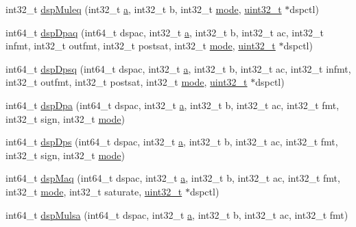 \begin{DoxyCompactItemize}
\item 
int32\_\-t \hyperlink{namespaceMipsISA_a1c1ae7be51569f81566b140606caa2bd}{dspMuleq} (int32\_\-t \hyperlink{namespaceMipsISA_ad15ace88a723e43c4e98c8c646891e79}{a}, int32\_\-t b, int32\_\-t \hyperlink{namespaceMipsISA_ae317cde5969f1a58116b73ae0d8adec0}{mode}, \hyperlink{Type_8hh_a435d1572bf3f880d55459d9805097f62}{uint32\_\-t} $\ast$dspctl)
\item 
int64\_\-t \hyperlink{namespaceMipsISA_a972387186c5bda88a6be1af70b202fd6}{dspDpaq} (int64\_\-t dspac, int32\_\-t \hyperlink{namespaceMipsISA_ad15ace88a723e43c4e98c8c646891e79}{a}, int32\_\-t b, int32\_\-t ac, int32\_\-t infmt, int32\_\-t outfmt, int32\_\-t postsat, int32\_\-t \hyperlink{namespaceMipsISA_ae317cde5969f1a58116b73ae0d8adec0}{mode}, \hyperlink{Type_8hh_a435d1572bf3f880d55459d9805097f62}{uint32\_\-t} $\ast$dspctl)
\item 
int64\_\-t \hyperlink{namespaceMipsISA_af540064c201122fe024672680efb7b83}{dspDpsq} (int64\_\-t dspac, int32\_\-t \hyperlink{namespaceMipsISA_ad15ace88a723e43c4e98c8c646891e79}{a}, int32\_\-t b, int32\_\-t ac, int32\_\-t infmt, int32\_\-t outfmt, int32\_\-t postsat, int32\_\-t \hyperlink{namespaceMipsISA_ae317cde5969f1a58116b73ae0d8adec0}{mode}, \hyperlink{Type_8hh_a435d1572bf3f880d55459d9805097f62}{uint32\_\-t} $\ast$dspctl)
\item 
int64\_\-t \hyperlink{namespaceMipsISA_aed3186e17a520b2f8e0086ffdd7020d4}{dspDpa} (int64\_\-t dspac, int32\_\-t \hyperlink{namespaceMipsISA_ad15ace88a723e43c4e98c8c646891e79}{a}, int32\_\-t b, int32\_\-t ac, int32\_\-t fmt, int32\_\-t sign, int32\_\-t \hyperlink{namespaceMipsISA_ae317cde5969f1a58116b73ae0d8adec0}{mode})
\item 
int64\_\-t \hyperlink{namespaceMipsISA_a1a929f7695ad8008ac3ccb032cdcdd6b}{dspDps} (int64\_\-t dspac, int32\_\-t \hyperlink{namespaceMipsISA_ad15ace88a723e43c4e98c8c646891e79}{a}, int32\_\-t b, int32\_\-t ac, int32\_\-t fmt, int32\_\-t sign, int32\_\-t \hyperlink{namespaceMipsISA_ae317cde5969f1a58116b73ae0d8adec0}{mode})
\item 
int64\_\-t \hyperlink{namespaceMipsISA_a6279e65f0daf37eafa4bbd108beb11a6}{dspMaq} (int64\_\-t dspac, int32\_\-t \hyperlink{namespaceMipsISA_ad15ace88a723e43c4e98c8c646891e79}{a}, int32\_\-t b, int32\_\-t ac, int32\_\-t fmt, int32\_\-t \hyperlink{namespaceMipsISA_ae317cde5969f1a58116b73ae0d8adec0}{mode}, int32\_\-t saturate, \hyperlink{Type_8hh_a435d1572bf3f880d55459d9805097f62}{uint32\_\-t} $\ast$dspctl)
\item 
int64\_\-t \hyperlink{namespaceMipsISA_a5ee886f543d611b1ed90edbab6ed65ea}{dspMulsa} (int64\_\-t dspac, int32\_\-t \hyperlink{namespaceMipsISA_ad15ace88a723e43c4e98c8c646891e79}{a}, int32\_\-t b, int32\_\-t ac, int32\_\-t fmt)

\end{DoxyCompactItemize}
